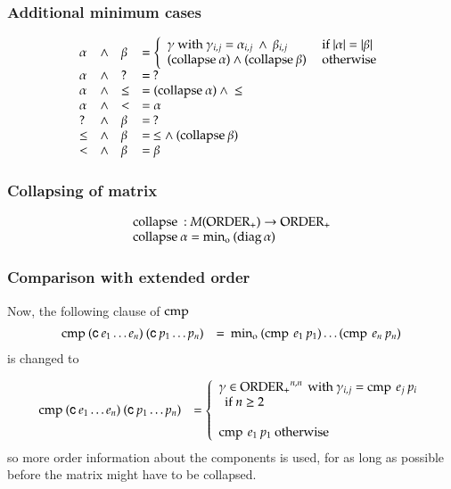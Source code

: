 \subsubsection{Additional minimum cases}
\[
\begin{array}{llll}
\alpha  & \wedge &\beta & = \left\{ \begin{array}{ll}
                          \gamma \mbox{ with } \gamma_{i,j} = \alpha_{i,j} \: \wedge \: \beta_{i,j} & \mbox{ if } \vert \alpha \vert = \vert \beta \vert \\
                          (\mathrm{collapse}\: \alpha) \wedge (\mathrm{collapse}\: \beta) & \mbox{ otherwise}  
                          \end{array}\right.\\ 
\alpha  & \wedge & ?     & = \: ? \\
\alpha  & \wedge & \leq  & = (\mathrm{collapse}\: \alpha) \: \wedge \: \leq \\
\alpha  & \wedge & <     & = \alpha \\
?       & \wedge & \beta & = \: ? \\
\leq    & \wedge & \beta & = \: \leq \wedge \: (\mathrm{collapse}\: \beta)\\
<       & \wedge & \beta & = \beta \\
\end{array}
\]

\subsubsection{Collapsing of matrix}
\[
\begin{array}{ll}
\multicolumn{2}{l}{\coll : M(\opl) \ra \opl}\\
\coll \alpha = \info \: (\diag \alpha) 
\end{array}
\]

\subsubsection{Comparison with extended order}
\noindent Now, the following clause of $\operatorname{cmp}$   
\[
\begin{array}[t]{ll}
\operatorname{cmp} \: (\mathsf{c} \: e_1 \ldots e_n) \: (\mathsf{c} \: p_1 \ldots p_n ) & = \: \operatorname{min_o} \: (\operatorname{cmp} \: e_1 \: p_1) \ldots (\operatorname{cmp} \: e_n \: p_n)\end{array}
\]
is changed to

\[
\begin{array}[t]{ll}
\operatorname{cmp} \: (\mathsf{c} \: e_1 \ldots e_n) \: (\mathsf{c} \: p_1 \ldots p_n ) & = 
\left\{\begin{array}{l} \gamma \in \operatorname{ORDER_{+}}^{n,n} \mbox{ with } \gamma_{i,j} = \operatorname{cmp} \: e_j \: p_i \\
\: \mbox{ if } n \geq 2 \\
\\
\operatorname{cmp} \: e_1 \: p_1 \mbox { otherwise}
\end{array}
\right.
\end{array}
\]
so more order information about the components is used, for as long as possible before the matrix might have to be collapsed.
